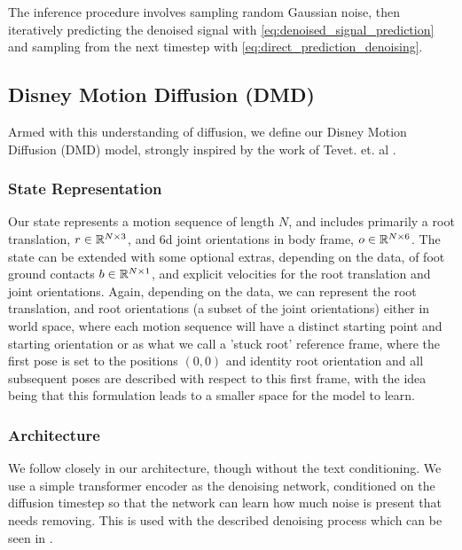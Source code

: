 The inference procedure involves sampling random Gaussian noise, then iteratively predicting the denoised signal with \eqref{eq:denoised_signal_prediction} and sampling from the next timestep with \eqref{eq:direct_prediction_denoising}.

\subsection{Disney Motion Diffusion (DMD)}
\label{sec:disney_motion_diffusion}
Armed with this understanding of diffusion, we define our Disney Motion Diffusion (DMD) model, strongly inspired by the work of Tevet. et. al \cite{MDM}.



\subsubsection{State Representation}
\label{sec:diffusion_state_representation}
Our state represents a motion sequence of length $N$, and includes primarily a root translation, $r \in \mathbb{R}^{N \times 3}$, and 6d \cite{aa_6d_angles} joint orientations in body frame, $o \in \mathbb{R}^{N \times 6}$. The state can be extended with some optional extras, depending on the data, of foot ground contacts $b \in \mathbb{R}^{N \times 1}$, and explicit velocities for the root translation and joint orientations. Again, depending on the data, we can represent the root translation, and root orientations (a subset of the joint orientations) either in world space, where each motion sequence will have a distinct starting point and starting orientation or as what we call a 'stuck root' reference frame, where the first pose is set to the positions $(0,0)$ and identity root orientation and all subsequent poses are described with respect to this first frame, with the idea being that this formulation leads to a smaller space for the model to learn.



\subsubsection{Architecture}
We follow closely \cite{MDM} in our architecture, though without the text conditioning. We use a simple transformer \cite{vaswani2017attention} encoder as the denoising network, conditioned on the diffusion timestep so that the network can learn how much noise is present that needs removing. This is used with the described denoising process which can be seen in .

